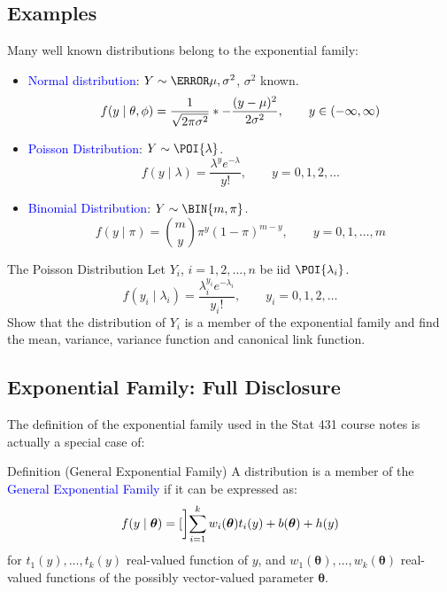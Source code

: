 \documentclass[oneside]{book}\usepackage[]{graphicx}\usepackage[svgnames]{xcolor}
\let\exp\relax%
\providecommand{\Vector}[1]{\bm{#1}}%
\begin{document}
\subsection*{Examples}
Many well known distributions belong to the exponential family:
\begin{itemize}
      \item \textcolor{Blue}{Normal distribution}: $ Y \sim \N{\mu,\sigma^2} $, $ \sigma^2 $ known.
            \[ f(y\mid \theta,\phi)=\frac{1}{\sqrt{2\pi\sigma^2}} \exp*{-\frac{(y-\mu)^2}{2\sigma^2}},\qquad y\in(-\infty,\infty) \]
      \item \textcolor{Blue}{Poisson Distribution}: $ Y \sim \POI{\lambda} $.
            \[ f(y\mid \lambda)=\frac{\lambda^y e^{-\lambda}}{y!},\qquad y=0,1,2,\ldots  \]
      \item \textcolor{Blue}{Binomial Distribution}: $ Y \sim \BIN{m,\pi} $.
            \[ f(y\mid \pi)=\binom{m}{y}\pi^y(1-\pi)^{m-y},\qquad y=0,1,\ldots,m \]
\end{itemize}
\begin{Example}{The Poisson Distribution}
      Let $ Y_i $, $ i=1,2,\ldots,n $ be iid $ \POI{\lambda_i} $.
      \[ f(y_i\mid \lambda_i)=\frac{\lambda_i^{y_i} e^{-\lambda_i}}{y_i!},\qquad y_i=0,1,2,\ldots \]
      Show that the distribution of $ Y_i $ is a member of the exponential family and find the
      mean, variance, variance function and canonical link function.
\end{Example}
\subsection*{Exponential Family: Full Disclosure}
The definition of the exponential family used in the Stat 431 course notes is actually a
special case of:
\begin{Regular}{Definition (General Exponential Family)}
      A distribution is a member of the \textcolor{Blue}{General Exponential Family} if it can be expressed as:
      \[ f(y\mid \Vector{\theta})=\exp[\bigg]{\sum_{i=1}^{k} w_i(\Vector{\theta})t_i(y)+b(\Vector{\theta})+h(y)} \]
      for $ t_1(y),\ldots,t_k(y) $ real-valued function of $ y $, and $ w_1(\Vector{\theta}),\ldots,w_k(\Vector{\theta}) $ real-valued
      functions of the possibly vector-valued parameter $ \Vector{\theta} $.
\end{Regular}
\end{document}
